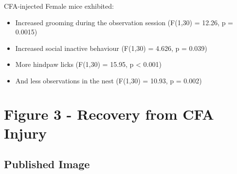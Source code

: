 \documentclass[
]{book}
\newenvironment{Shaded}{\begin{snugshade}}{\end{snugshade}}
\newcommand{\AttributeTok}[1]{\textcolor[rgb]{0.77,0.63,0.00}{#1}}
\newcommand{\ConstantTok}[1]{\textcolor[rgb]{0.00,0.00,0.00}{#1}}
\newcommand{\DecValTok}[1]{\textcolor[rgb]{0.00,0.00,0.81}{#1}}
\newcommand{\FunctionTok}[1]{\textcolor[rgb]{0.00,0.00,0.00}{#1}}
\newcommand{\NormalTok}[1]{#1}
\newcommand{\SpecialCharTok}[1]{\textcolor[rgb]{0.00,0.00,0.00}{#1}}
\newcommand{\StringTok}[1]{\textcolor[rgb]{0.31,0.60,0.02}{#1}}
\providecommand{\tightlist}{%
  \setlength{\itemsep}{0pt}\setlength{\parskip}{0pt}}
\begin{document}
CFA-injected Female mice exhibited:

\begin{itemize}
\tightlist
\item
  Increased grooming during the observation session (F(1,30) = 12.26, p = 0.0015)
\item
  Increased social inactive behaviour (F(1,30) = 4.626, p = 0.039)
\item
  More hindpaw licks (F(1,30) = 15.95, p \textless{} 0.001)
\item
  And less observations in the nest (F(1,30) = 10.93, p = 0.002)
\end{itemize}

\begin{Shaded}
\end{Shaded}

\hypertarget{figure-3---recovery-from-cfa-injury}{%
\chapter*{Figure 3 - Recovery from CFA Injury}\label{figure-3---recovery-from-cfa-injury}}

\hypertarget{published-image-2}{%
\section*{Published Image}\label{published-image-2}}
\end{document}
